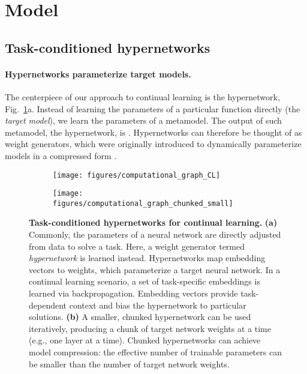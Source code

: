 \documentclass{article}
\begin{document}
\section{Model}

\subsection{Task-conditioned hypernetworks}

\paragraph{Hypernetworks parameterize target models.} The centerpiece of our approach to continual learning is the hypernetwork, Fig.~\ref{fig:hypernets}a. Instead of learning the parameters  of a particular function  directly (the \emph{target model}), we learn the parameters  of a metamodel. The output of such metamodel, the hypernetwork, is . Hypernetworks can therefore be thought of as weight generators, which were originally introduced to dynamically parameterize models in a compressed form \citep{ha_hypernetworks_2017,schmidhuber1992learning,bertinetto_learning_2016,jia_dynamic_2016}.


\begin{figure}[htbp]
    \begin{subfigure}{0.63\linewidth}
    \caption{\vspace{-0.15cm}}
    \texttt{[image: figures/computational\_graph\_CL]}
    \end{subfigure}
    \begin{subfigure}{0.35\linewidth}
    \caption{\vspace{-0.15cm}}
    \texttt{[image: figures/computational\_graph\_chunked\_small]}
    \end{subfigure}

  \caption{\textbf{Task-conditioned hypernetworks for continual learning.} \textbf{(a)} Commonly, the parameters of a neural network are directly adjusted from data to solve a task. Here, a weight generator termed \emph {hypernetwork} is learned instead. Hypernetworks map embedding vectors to weights, which parameterize a target neural network. In a continual learning scenario, a set of task-specific embeddings is learned via backpropagation. Embedding vectors provide task-dependent context and bias the hypernetwork to particular solutions. \textbf{(b)} A smaller, chunked hypernetwork can be used iteratively, producing a chunk of target network weights at a time (e.g., one layer at a time). Chunked hypernetworks can achieve model compression: the effective number of trainable parameters can be smaller than the number of target network weights. \label{fig:hypernets}}
\end{figure}
\end{document}
